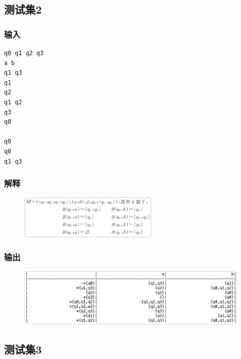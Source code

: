 \documentclass[lang=cn,11pt,a4paper,cite=authornum]{paper}
\begin{document}
\subsection{测试集2}

\subsubsection{输入}

\begin{listing}[H]
\begin{verbatim}
q0 q1 q2 q3 
a b
q1 q3
q1
q2
q1 q2
q3
q0

q0
q0
q1 q3
\end{verbatim}
\end{listing}

\subsubsection{解释}

\begin{figure}[htbp]

    \centering\includegraphics[width=0.6\textwidth]{./Images/img5.png}

\end{figure}

\subsubsection{输出}

\begin{figure}[htbp]

    \centering\includegraphics[width=\textwidth]{./Images/img6.png}

\end{figure}

\subsection{测试集3}
\end{document}
